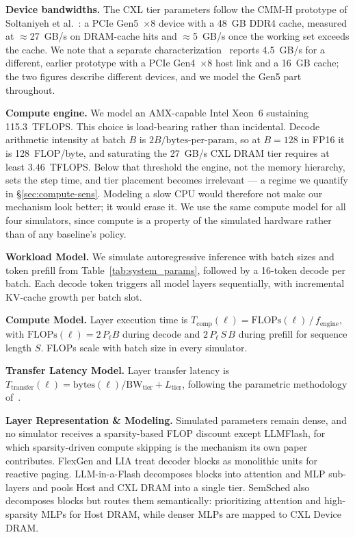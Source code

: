\documentclass[10pt,conference,letterpaper]{IEEEtran}
\begin{document}
\noindent\textbf{Device bandwidths.} The CXL tier parameters follow the CMM-H prototype of Soltaniyeh et al.~\cite{soltaniyeh2025revisiting}: a PCIe Gen5~$\times$8 device with a 48~GB DDR4 cache, measured at $\approx$27~GB/s on DRAM-cache hits and $\approx$5~GB/s once the working set exceeds the cache. We note that a separate characterization~\cite{zeng2025performance} reports 4.5~GB/s for a different, earlier prototype with a PCIe Gen4~$\times$8 host link and a 16~GB cache; the two figures describe different devices, and we model the Gen5 part throughout.

\noindent\textbf{Compute engine.} We model an AMX-capable Intel Xeon~6 sustaining 115.3~TFLOPS. This choice is load-bearing rather than incidental. Decode arithmetic intensity at batch $B$ is $2B/\text{bytes-per-param}$, so at $B{=}128$ in FP16 it is 128~FLOP/byte, and saturating the 27~GB/s CXL DRAM tier requires at least $3.46$~TFLOPS. Below that threshold the engine, not the memory hierarchy, sets the step time, and tier placement becomes irrelevant --- a regime we quantify in \S\ref{sec:compute-sens}. Modeling a slow CPU would therefore not make our mechanism look better; it would erase it. We use the same compute model for all four simulators, since compute is a property of the simulated hardware rather than of any baseline's policy.

\noindent
\textbf{Workload Model.} We simulate autoregressive inference with batch sizes and token prefill from Table~\ref{tab:system_params}, followed by a 16-token decode per batch. Each decode token triggers all model layers sequentially, with incremental KV-cache growth per batch slot.

\noindent
\textbf{Compute Model.} Layer execution time is $T_\text{comp}(\ell) = \text{FLOPs}(\ell)\,/\,f_\text{engine}$, with $\text{FLOPs}(\ell) = 2\,P_\ell B$ during decode and $2\,P_\ell\,S\,B$ during prefill for sequence length $S$. FLOPs scale with batch size in every simulator.

\noindent
\textbf{Transfer Latency Model.} Layer transfer latency is
$T_\text{transfer}(\ell) = \text{bytes}(\ell) / \text{BW}_\text{tier} + L_\text{tier}$,
following the parametric methodology of~\cite{soltaniyeh2025revisiting}.

\noindent\textbf{Layer Representation \& Modeling.} Simulated parameters remain dense, and no simulator receives a sparsity-based FLOP discount except LLMFlash, for which sparsity-driven compute skipping is the mechanism its own paper contributes. FlexGen and LIA treat decoder blocks as monolithic units for reactive paging. LLM-in-a-Flash decomposes blocks into attention and MLP sub-layers and pools Host and CXL DRAM into a single tier. SemSched also decomposes blocks but routes them semantically: prioritizing attention and high-sparsity MLPs for Host DRAM, while denser MLPs are mapped to CXL Device DRAM.
\end{document}
